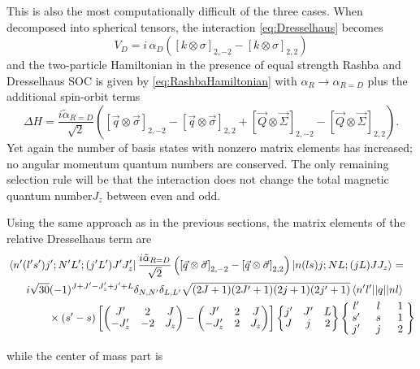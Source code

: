 \documentclass[%
 preprint,
 amsmath,amssymb,
 aps,
]{revtex4-1}
\newcommand{\threej}[6]{ \begin{pmatrix}
  #1 & #2 & #3 \\
  #4 & #5 & #6 
 \end{pmatrix}}
\newcommand{\sixj}[6]{ \begin{Bmatrix}
  #1 & #2 & #3 \\
  #4 & #5 & #6 
 \end{Bmatrix}}
\newcommand{\ninej}[9]{ \begin{Bmatrix}
  #1 & #2 & #3 \\
  #4 & #5 & #6 \\
  #7 & #8 & #9
 \end{Bmatrix}}
\begin{document}
This is also the most computationally difficult of the three cases. When decomposed into spherical tensors, the interaction \eqref{eq:Dresselhaus} becomes
\begin{equation}
V_D=i\,\alpha_D \left( \left[ k \otimes \sigma \right]_{2,-2}- \left[ k \otimes \sigma \right]_{2,2}\right)
\end{equation}
and the two-particle Hamiltonian in the presence of equal strength Rashba and Dresselhaus SOC is given by \eqref{eq:RashbaHamiltonian} with $\alpha_R\rightarrow \alpha_{R=D}$ plus the additional spin-orbit terms
\begin{equation}\label{eq:DresselhausHamiltonian}
\Delta H= \frac{i \tilde{\alpha}_{R=D}}{\sqrt{2}}\left(  \left[ \vec{q} \otimes \vec{\sigma} \right]_{2,-2} -  \left[ \vec{q} \otimes \vec{\sigma} \right]_{2,2} +[ \vec{Q} \otimes \vec{\Sigma} ]_{2,-2} -  [ \vec{Q} \otimes \vec{\Sigma} ]_{2,2} \right).
\end{equation} 
Yet again the number of basis states with nonzero matrix elements has increased; no angular momentum quantum numbers are conserved. The only remaining selection rule will be that the interaction does not change the total magnetic quantum number$J_z$ between even and odd. 

Using the same approach as in the previous sections, the matrix elements of the relative Dresselhaus term are
\begin{equation}\begin{split}
&\bra{n'(l's')j';N'L';(j'L')J'J'_z} \frac{i \tilde{\alpha}_{R=D}}{\sqrt{2}}\left(  \left[ \vec{q} \otimes \vec{\sigma} \right]_{2,-2} -  \left[ \vec{q} \otimes \vec{\sigma} \right]_{2,2} \right)  \ket{n(ls)j;NL;(jL)JJ_z} = \\
 &\quad\hphantom{\times} i \sqrt{30}(-1)^{J+J'-J'_z+j'+L}\delta_{N,N'}\delta_{L,L'} \sqrt{(2J+1)(2J'+1)(2j+1)(2j'+1)}  \braket{n'l' || q || n l}\\
 &\hspace{1cm}\quad \times(s'-s) \left[\threej{J'}{2}{J}{-J'_z}{-2}{J_z}-\threej{J'}{2}{J}{-J'_z}{2}{J_z}\right] \sixj{j'}{J'}{L}{J}{j}{2}
 \renewcommand{\arraystretch}{0.9} \ninej{\hphantom{l}l'\hphantom{l}}{\hphantom{l}l\hphantom{l}}{\hphantom{l}1\hphantom{l}}{s'}{s}{1}{j'}{j}{2}
\end{split}
\end{equation}

while the center of mass part is
\end{document}
